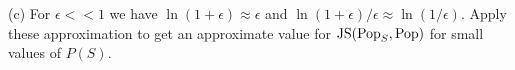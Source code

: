 \documentclass{article}
\newcommand{\solution}[1]{}
\begin{document}
{\medskip
(c) For $\epsilon << 1$ we have $\ln(1+ \epsilon) \approx \epsilon$ and $\ln(1+ \epsilon)/\epsilon \approx \ln(1/\epsilon)$.  Apply these approximation
to get an approximate value for $\mathrm{JS}(\mathrm{Pop}_S,\mathrm{Pop})$ for small values of $P(S)$.

\solution{
  \begin{eqnarray*}
    \mathrm{JS}(\pop_S,\pop,Q) & =  &\frac{1}{2}\left(\mathrm{KL}\left(\pop_S,\frac{\pop_S+\pop}{2}\right) + \mathrm{KL}\left(\pop,\frac{\pop_S+\pop}{2}\right)\right) \\
    \\
    & \approx & \frac{1}{2}\left(\ln 2 - \epsilon + \ln 2 - \epsilon \ln \frac{1}{\epsilon}\right) \\
    \\
    & = & \ln 2 - \frac{\epsilon}{2}\left(1 + \ln \frac{1}{\epsilon}\right) \\
    \\
    \epsilon & = & \pop(S)
  \end{eqnarray*}
}
}
\end{document}
